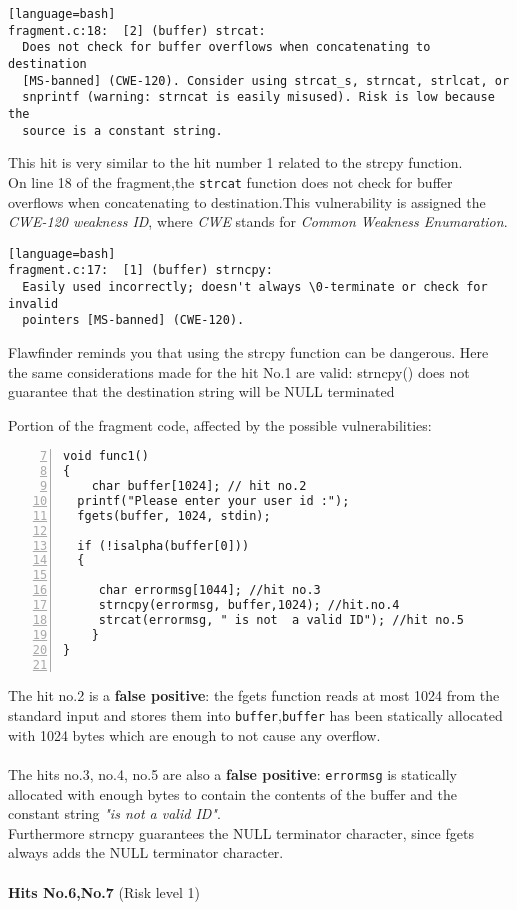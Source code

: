\documentclass[a4paper,12pt]{article}
\begin{document}
\begin{lstlisting}[style=DOS][language=bash]
fragment.c:18:  [2] (buffer) strcat:
  Does not check for buffer overflows when concatenating to destination
  [MS-banned] (CWE-120). Consider using strcat_s, strncat, strlcat, or
  snprintf (warning: strncat is easily misused). Risk is low because the
  source is a constant string.
\end{lstlisting}
This hit is very similar to the hit number 1 related to the strcpy function.\\
On line 18 of the fragment,the \texttt{strcat} function does not check for buffer overflows when concatenating to destination.This vulnerability is assigned the \textit{CWE-120 weakness ID}, where \textit{CWE} stands for \textit{Common Weakness Enumaration}\cite{CWE}.\\
\begin{lstlisting}[style=DOS][language=bash]
fragment.c:17:  [1] (buffer) strncpy:
  Easily used incorrectly; doesn't always \0-terminate or check for invalid
  pointers [MS-banned] (CWE-120).
\end{lstlisting}
Flawfinder reminds you that using the strcpy function can be dangerous.
Here the same considerations made for the hit No.1 are valid: strncpy() does not guarantee that the destination string will be NULL terminated \cite{geeksstrcpy}
\newpage
\noindent

Portion of the fragment code, affected by the possible vulnerabilities:
\begin{lstlisting}[style=c,numbers=left,firstnumber=7,linebackgroundcolor={
\ifnum\value{lstnumber}=9\color{green}\fi
\ifnum\value{lstnumber}=16\color{green}\fi
\ifnum\value{lstnumber}=17\color{green}\fi
\ifnum\value{lstnumber}=18\color{green}\fi}]
void func1()
{	
	char buffer[1024]; // hit no.2
  printf("Please enter your user id :");
  fgets(buffer, 1024, stdin);
 
  if (!isalpha(buffer[0]))
  {

     char errormsg[1044]; //hit no.3
     strncpy(errormsg, buffer,1024); //hit.no.4
     strcat(errormsg, " is not  a valid ID"); //hit no.5
 	}
}


\end{lstlisting}
The hit no.2 is a \textbf{false positive}: the fgets function reads at most 1024 from the standard input and stores them into \texttt{buffer},\texttt{buffer} has been statically allocated with 1024 bytes which are enough to not cause any overflow.\\\\
The hits no.3, no.4, no.5 are also a \textbf{false positive}: \texttt{errormsg} is statically allocated with enough bytes to contain the contents of the buffer and the constant string \textit{"is not  a valid ID"}.\\
Furthermore strncpy guarantees the NULL terminator character, since fgets always adds the NULL terminator character.
\\
\\
\textbf{Hits No.6,No.7} (Risk level 1)
\end{document}
